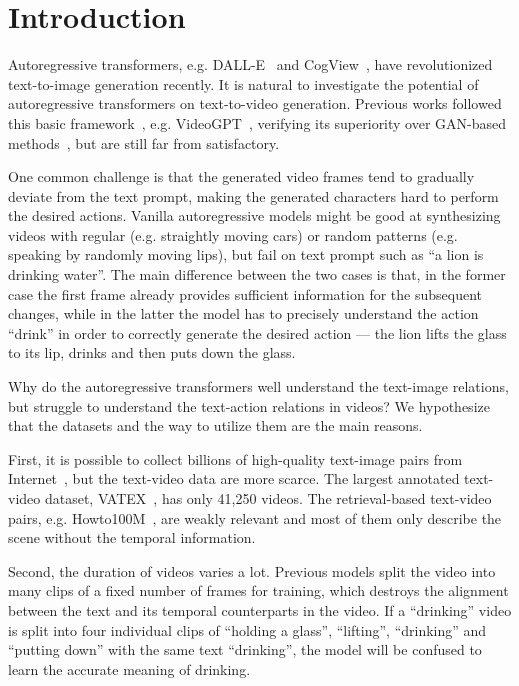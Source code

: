 
\section{Introduction}\label{sec:intro}

Autoregressive transformers, e.g. DALL-E~\cite{ramesh2021zero} and CogView~\cite{ding2021cogview}, have revolutionized text-to-image generation recently. It is natural to investigate the potential of autoregressive transformers on text-to-video generation. Previous works followed this basic framework~\cite{wu2021n,ge2022long}, e.g. VideoGPT~\cite{yan2021videogpt}, verifying its superiority over GAN-based methods~\cite{clark2019adversarial,tulyakov2018mocogan}, but are still far from satisfactory. 

One common challenge is that the generated video frames tend to gradually deviate from the text prompt, making the generated characters hard to perform the desired actions. Vanilla autoregressive models might be good at synthesizing videos with  regular (e.g. straightly moving cars) or  random patterns (e.g. speaking by randomly moving lips), 
but fail on text prompt such as ``a lion is drinking water''.
The main difference between the two cases is that, in the former case the first frame already provides sufficient information for the subsequent changes, while in the latter  the model has to precisely understand the action ``drink'' in order to correctly generate the desired action --- the lion lifts the glass to its lip, drinks and then puts down the glass.

Why do the autoregressive transformers well understand the text-image relations, but struggle to understand the text-action  relations in videos? We hypothesize that the datasets and the way to utilize them are the main reasons.

First, it is possible to collect billions of high-quality text-image pairs from Internet~\cite{ramesh2021zero}, but the text-video data are more scarce. The largest annotated text-video dataset, VATEX~\cite{wang2019vatex},  has only 41,250 videos. The retrieval-based text-video pairs, e.g. Howto100M~\cite{miech2019howto100m}, are weakly relevant and most of them only describe the scene without the temporal information. 

Second, the duration of videos varies a lot. Previous models split the video into many clips of a fixed number of frames for training, which 
destroys the alignment between the text and its temporal counterparts in the video. If a ``drinking'' video is split into four individual clips of ``holding a glass'', ``lifting'', ``drinking'' and ``putting down'' with the same text ``drinking'', the model will be confused to learn the accurate meaning of drinking. 

